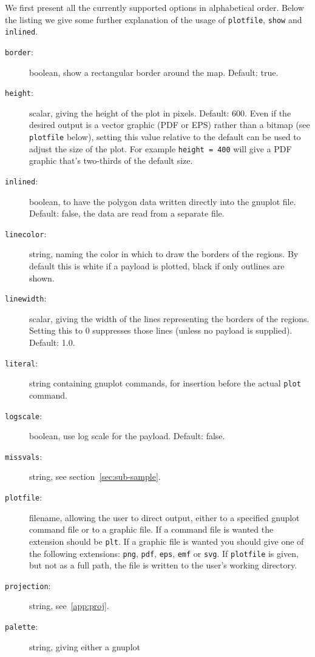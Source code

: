 \documentclass{article}
\begin{document}
We first present all the currently supported options in alphabetical
order. Below the listing we give some further explanation of the usage
of \texttt{plotfile}, \texttt{show} and \texttt{inlined}.

\begin{description}
\item[\texttt{border}:] boolean, show a rectangular border around the
  map. Default: true.
\item[\texttt{height}:] scalar, giving the height of the plot in
  pixels. Default: 600. Even if the desired output is a vector graphic
  (PDF or EPS) rather than a bitmap (see \texttt{plotfile} below),
  setting this value relative to the default can be used to adjust the
  size of the plot. For example \texttt{height = 400} will give a PDF
  graphic that's two-thirds of the default size.
\item[\texttt{inlined}:] boolean, to have the polygon data written
  directly into the \textsf{gnuplot} file. Default: false, the data
  are read from a separate file.
\item[\texttt{linecolor}:] string, naming the color in which to draw
  the borders of the regions. By default this is white if a payload is
  plotted, black if only outlines are shown.
\item[\texttt{linewidth}:] scalar, giving the width of the lines
  representing the borders of the regions. Setting this to 0
  suppresses those lines (unless no payload is supplied). Default:
  1.0.
\item[\texttt{literal}:] string containing \textsf{gnuplot} commands,
  for insertion before the actual \texttt{plot} command.
\item[\texttt{logscale}:] boolean, use log scale for the
  payload. Default: false.
\item[\texttt{missvals}:] string, see section~\ref{sec:sub-sample}.
\item[\texttt{plotfile}:] filename, allowing the user to direct
  output, either to a specified \textsf{gnuplot} command file or to a
  graphic file. If a command file is wanted the extension should be
  \texttt{plt}. If a graphic file is wanted you should give one of the
  following extensions: \texttt{png}, \texttt{pdf}, \texttt{eps},
  \texttt{emf} or \texttt{svg}.  If \texttt{plotfile} is given, but
  not as a full path, the file is written to the user's working
  directory.
\item[\texttt{projection}:] string, see~\ref{app:proj}.
\item[\texttt{palette}:] string, giving either a \textsf{gnuplot}

\end{description}
\end{document}
